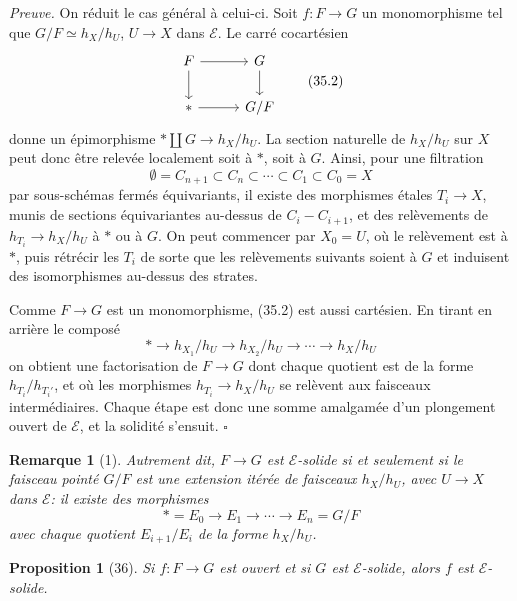 \documentclass[11pt]{article}
\newcommand{\pt}{*}
\theoremstyle{deligne}
\newtheorem*{proposition*}{Proposition}
\newtheorem*{remark*}{Remarque}
\newenvironment{proofdel}{\noindent\textit{Preuve.}}{\hfill$\square$}
\begin{document}
\begin{proofdel}
On réduit le cas général à celui-ci. Soit \(f:F\to G\) un monomorphisme tel que \(G/F\simeq h_X/h_U\), \(U\to X\) dans \(\mathcal E\). Le carré cocartésien
\[
\begin{tikzcd}[column sep=2.8em,row sep=1.8em]
F \arrow[r] \arrow[d] & G \arrow[d]\\
\pt \arrow[r] & G/F
\end{tikzcd}
\tag{35.2}
\]
donne un épimorphisme \(\pt\amalg G\to h_X/h_U\). La section naturelle de \(h_X/h_U\) sur \(X\) peut donc être relevée localement soit à \(\pt\), soit à \(G\). Ainsi, pour une filtration
\[
\emptyset=C_{n+1}\subset C_n\subset\cdots\subset C_1\subset C_0=X
\]
par sous-schémas fermés équivariants, il existe des morphismes étales \(T_i\to X\), munis de sections équivariantes au-dessus de \(C_i-C_{i+1}\), et des relèvements de \(h_{T_i}\to h_X/h_U\) à \(\pt\) ou à \(G\). On peut commencer par \(X_0=U\), où le relèvement est à \(\pt\), puis rétrécir les \(T_i\) de sorte que les relèvements suivants soient à \(G\) et induisent des isomorphismes au-dessus des strates.

Comme \(F\to G\) est un monomorphisme, (35.2) est aussi cartésien. En tirant en arrière le composé
\[
\pt\longrightarrow h_{X_1}/h_U\longrightarrow h_{X_2}/h_U\longrightarrow\cdots\longrightarrow h_X/h_U
\]
on obtient une factorisation de \(F\to G\) dont chaque quotient est de la forme \(h_{T_i}/h_{T_i'}\), et où les morphismes \(h_{T_i}\to h_X/h_U\) se relèvent aux faisceaux intermédiaires. Chaque étape est donc une somme amalgamée d'un plongement ouvert de \(\mathcal E\), et la solidité s'ensuit.
\end{proofdel}

\begin{remark*}[1]
Autrement dit, \(F\to G\) est \(\mathcal E\)-solide si et seulement si le faisceau pointé \(G/F\) est une extension itérée de faisceaux \(h_X/h_U\), avec \(U\to X\) dans \(\mathcal E\): il existe des morphismes
\[
\pt=E_0\to E_1\to\cdots\to E_n=G/F
\]
avec chaque quotient \(E_{i+1}/E_i\) de la forme \(h_X/h_U\).
\end{remark*}

\begin{proposition*}[36]
Si \(f:F\to G\) est ouvert et si \(G\) est \(\mathcal E\)-solide, alors \(f\) est \(\mathcal E\)-solide.
\end{proposition*}
\end{document}
